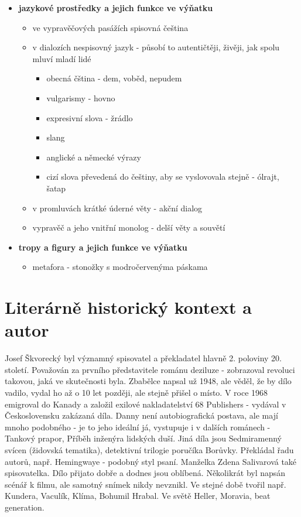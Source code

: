 \documentclass[11pt]{article}
\begin{document}
\begin{itemize}
\begin{itemize}
        \end{itemize}
        \item\textbf{jazykové prostředky a jejich funkce ve výňatku}
        \begin{itemize}
            \item ve vypravěčových pasážích spisovná čeština
            \item v dialozích nespisovný jazyk - působí to autentičtěji, živěji, jak spolu mluví mladí lidé
            \begin{itemize}
                \item obecná čština - dem, voběd, nepudem
                \item vulgarismy - hovno
                \item expresivní slova - žrádlo
                \item slang
                \item anglické a německé výrazy
                \item cizí slova převedená do češtiny, aby se vyslovovala stejně - ólrajt, šatap
            \end{itemize}
            \item v promluvách krátké úderné věty - akční dialog
            \item vypravěč a jeho vnitřní monolog - delší věty a souvětí
        \end{itemize}
        \item\textbf{tropy a figury a jejich funkce ve výňatku}
        \begin{itemize}
            \item metafora - stonožky s modročervenýma páskama
        \end{itemize}
    \end{itemize}
    \section*{Literárně historický kontext a autor}
    Josef Škvorecký byl významný spisovatel a překladatel hlavně 2. poloviny 20. století.
    Považován za prvního představitele románu deziluze - zobrazoval revoluci takovou, jaká ve skutečnosti byla.
    Zbabělce napsal už 1948, ale věděl, že by dílo vadilo, vydal ho až o 10 let později, ale stejně přišel o místo.
    V roce 1968 emigroval do Kanady a založil exilové nakladatelství 68 Publishers - vydával v Československu zakázaná díla.
    Danny není autobiografická postava, ale mají mnoho podobného - je to jeho ideální já, vystupuje i v dalších románech - Tankový prapor, Příběh inženýra lidských duší.
    Jiná díla jsou Sedmiramenný svícen (židovská tematika), detektivní trilogie poručíka Borůvky. Překládal řadu autorů, např. Hemingwaye - podobný styl psaní.
    Manželka Zdena Salivarová také spisovatelka.
    Dílo přijato dobře a dodnes jsou oblíbená. Několikrát byl napsán scénář k filmu, ale samotný snímek nikdy nevznikl.
    Ve stejné době tvořil např. Kundera, Vaculík, Klíma, Bohumil Hrabal. Ve světě Heller, Moravia, beat generation.
\end{document}

